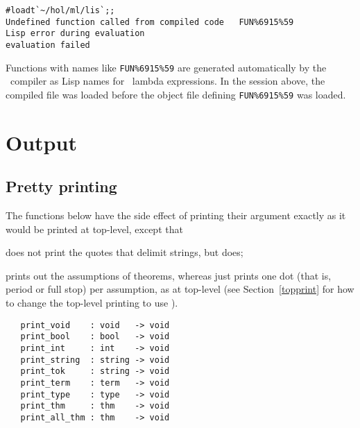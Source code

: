 \setcounter{sessioncount}{1}
\begin{session}\begin{verbatim}
#loadt`~/hol/ml/lis`;;
Undefined function called from compiled code   FUN%6915%59
Lisp error during evaluation
evaluation failed      
\end{verbatim}\end{session}

Functions with names like {\small\verb&FUN%6915%59&} are generated automatically by
the \ML\ compiler as Lisp names for \ML\ lambda expressions. In the session above,
the compiled file  was loaded before the object file defining
{\small\verb&FUN%6915%59&} was loaded.



\section{Output}

\subsection{Pretty printing}
\label{pretty-print}

The functions below have the side effect of printing
their argument exactly as it would be printed at top-level, except that
\begin{myenumerate}
\item {} does not print the 
quotes that delimit
strings, but  does;
\item {} prints out the assumptions of theorems, whereas
 just prints one dot (that is, period or full stop)
per assumption, as at top-level
(see Section~\ref{topprint} for how to change the top-level printing to use
).
\end{myenumerate}


\begin{boxed}
\begin{verbatim}
   print_void    : void   -> void
   print_bool    : bool   -> void
   print_int     : int    -> void
   print_string  : string -> void
   print_tok     : string -> void
   print_term    : term   -> void
   print_type    : type   -> void
   print_thm     : thm    -> void
   print_all_thm : thm    -> void
\end{verbatim}\end{boxed}


